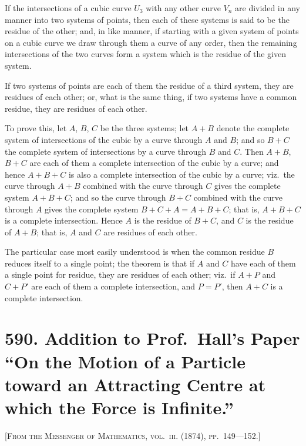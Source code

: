 \documentclass[11pt,a4paper]{book}
\begin{document}
If the intersections of a cubic curve $U_3$ with any other curve $V_n$ are divided in any manner into two systems of points, then each of these systems is said to be the residue of the other; and, in like manner, if starting with a given system of points on a cubic curve we draw through them a curve of any order, then the remaining intersections of the two curves form a system which is the residue of the given system.

If two systems of points are each of them the residue of a third system, they are residues of each other; or, what is the same thing, if two systems have a common residue, they are residues of each other.

To prove this, let $A$, $B$, $C$ be the three systems; let $A + B$ denote the complete system of intersections of the cubic by a curve through $A$ and $B$; and so $B + C$ the complete system of intersections by a curve through $B$ and $C$. Then $A + B$, $B + C$ are each of them a complete intersection of the cubic by a curve; and hence $A + B + C$ is also a complete intersection of the cubic by a curve; viz.\ the curve through $A + B$ combined with the curve through $C$ gives the complete system $A + B + C$; and so the curve through $B + C$ combined with the curve through $A$ gives the complete system $B + C + A = A + B + C$; that is, $A + B + C$ is a complete intersection. Hence $A$ is the residue of $B + C$, and $C$ is the residue of $A + B$; that is, $A$ and $C$ are residues of each other.

The particular case most easily understood is when the common residue $B$ reduces itself to a single point; the theorem is that if $A$ and $C$ have each of them a single point for residue, they are residues of each other; viz.\ if $A + P$ and $C + P'$ are each of them a complete intersection, and $P = P'$, then $A + C$ is a complete intersection.

\newpage

\section*{590. Addition to Prof.\ Hall's Paper ``On the Motion of a Particle toward an Attracting Centre at which the Force is Infinite.''}

\noindent\textsc{[From the Messenger of Mathematics, vol.~\textsc{iii}. (1874), pp.~149---152.]}
\end{document}
